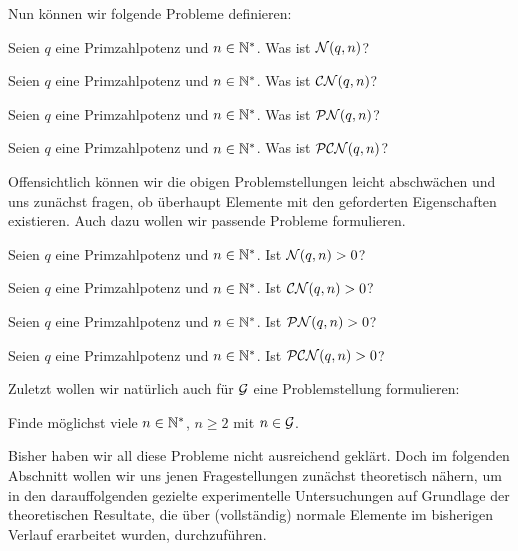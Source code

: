 Nun können wir folgende Probleme definieren:

\begin{problem}[$\cal N(q,n)=?$]
  \label{prob:n=}
  Seien $q$ eine Primzahlpotenz und $n\in \N^\ast$. Was ist
  $\cal N(q,n)$?
\end{problem}
\begin{problem}[$\CN(q,n)=?$]
  \label{prob:cn=}
  Seien $q$ eine Primzahlpotenz und $n\in \N^\ast$. Was ist
  $\CN(q,n)$?
\end{problem}
\begin{problem}[$\PN(q,n)=?$]
  \label{prob:pn=}
  Seien $q$ eine Primzahlpotenz und $n\in \N^\ast$. Was ist
  $\PN(q,n)$?
\end{problem}
\begin{problem}[$\PCN(q,n)=?$]
  \label{prob:pcn=}
  Seien $q$ eine Primzahlpotenz und $n\in \N^\ast$. Was ist
  $\PCN(q,n)$?
\end{problem}

Offensichtlich können wir die obigen Problemstellungen leicht abschwächen und
uns zunächst fragen, ob überhaupt Elemente mit den geforderten Eigenschaften
existieren. Auch dazu wollen wir passende Probleme formulieren.

\begin{problem}[$\cal N(q,n)>0?$]
  \label{prob:n>0}
  Seien $q$ eine Primzahlpotenz und $n\in \N^\ast$. Ist
  $\cal N(q,n)>0$?
\end{problem}
\begin{problem}[$\CN(q,n)>0?$]
  \label{prob:cn>0}
  Seien $q$ eine Primzahlpotenz und $n\in \N^\ast$. Ist
  $\CN(q,n)>0$?
\end{problem}
\begin{problem}[$\PN(q,n)>0?$]
  \label{prob:pn>0}
  Seien $q$ eine Primzahlpotenz und $n\in \N^\ast$. Ist
  $\PN(q,n)>0$?
\end{problem}
\begin{problem}[$\PCN(q,n)>0?$]
  \label{prob:pcn>0}
  Seien $q$ eine Primzahlpotenz und $n\in \N^\ast$. Ist
  $\PCN(q,n)>0$?
\end{problem}


Zuletzt wollen wir natürlich auch für $\G$ eine Problemstellung 
formulieren:

\begin{problem}[$n\in \G ?$]
  \label{prob:g}
  Finde möglichst viele $n\in \N^\ast$, $n\geq 2$ mit $n\in \G$.
\end{problem}

Bisher haben wir all diese Probleme nicht ausreichend geklärt. Doch im
folgenden Abschnitt wollen wir uns jenen Fragestellungen zunächst theoretisch
nähern, um in den darauffolgenden gezielte experimentelle Untersuchungen 
auf Grundlage der
theoretischen Resultate, die über (vollständig) normale Elemente im bisherigen
Verlauf erarbeitet wurden, durchzuführen.


